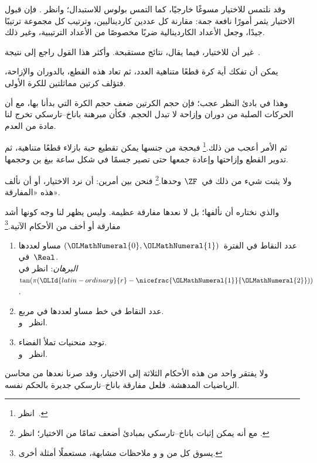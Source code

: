 \documentclass[../../../include/open-logic-section]{subfiles}
\begin{document}

وقد نلتمس للاختيار مسوغًا خارجيًا، كما التمس بولوس للاستبدال؛ وانظر
. فإن قبول الاختيار يثمر أمورًا
نافعة جمة: مقارنة كل عددين كارديناليين، وترتيب كل مجموعة ترتيبًا جيدًا،
وجعل الأعداد الكاردينالية ضربًا مخصوصًا من الأعداد الترتيبية، وغير ذلك.

غير أن للاختيار، فيما يقال، نتائج مستقبحة. وأكثر هذا القول راجع إلى
نتيجة~\cite{BanachTarski1924}.

\begin{thm}
يمكن أن تفكك أية كرة قطعًا متناهية العدد، ثم تعاد هذه القطع، بالدوران
والإزاحة، فتؤلف كرتين مماثلتين للكرة الأولى.
\end{thm}
\noindent
وهذا في بادئ النظر عجب؛ فإن حجم الكرتين ضعف حجم الكرة التي بدأنا بها،
مع أن الحركات الصلبة من دوران وإزاحة لا تبدل الحجم. فكأن مبرهنة
باناخ--تارسكي تخرج لنا مادة من العدم.

ثم الأمر أعجب من ذلك.\footnote{انظر~\citet[Theorem 3.12]{Wagon2016}.}
فبحجة من جنسها يمكن تقطيع حبة بازلاء قطعًا متناهية، ثم تدوير القطع
وإزاحتها وإعادة جمعها حتى تصير جسمًا في شكل ساعة بيغ بن وحجمها.

ولا يثبت شيء من ذلك في~$\ZF$ وحدها.\footnote{مع أنه يمكن إثبات
باناخ--تارسكي بمبادئ أضعف تمامًا من الاختيار؛ انظر
\citet[303]{Wagon2016}.} فنحن بين أمرين: أن نرد الاختيار، أو أن نألف
هذه «المفارقة».

والذي نختاره أن نألفها؛ بل لا نعدها مفارقة عظيمة. وليس يظهر لنا وجه
كونها أشد مفارقة أو أخف من الأحكام الآتية.\footnote{يسوق كل من
\citet[276--7]{Potter2004} و\citet[16]{Weston2003} و
\citet[31, 308--9]{Wagon2016} ملاحظات مشابهة، مستعملًا أمثلة أخرى.}
\begin{enumerate}
	\item عدد النقاط في الفترة~$(\OLMathNumeral{0},\OLMathNumeral{1})$ مساو لعددها في~$\Real$.
	\\\emph{البرهان}: انظر في~$\tan(\pi(\OLId{latin-ordinary}{r}-\nicefrac{\OLMathNumeral{1}}{\OLMathNumeral{2}}))$.
	\item عدد النقاط في خط مساو لعددها في مربع.
	\\انظر~ و.
	\item توجد منحنيات تملأ الفضاء.
	\\انظر~ و.
\end{enumerate}
ولا يفتقر واحد من هذه الأحكام الثلاثة إلى الاختيار، وقد صرنا نعدها من
محاسن الرياضيات المدهشة. فلعل مفارقة باناخ--تارسكي جديرة بالحكم نفسه.
\end{document}
